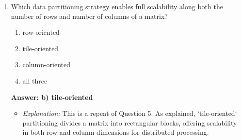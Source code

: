 \documentclass{article}
\begin{document}
\begin{enumerate}[label=\textbf{Question \arabic*.}]
\item Which data partitioning strategy enables full scalability along both the number of rows and number of columns of a matrix?
    \begin{enumerate}[label=\alph*)]
        \item row-oriented
        \item tile-oriented
        \item column-oriented
        \item all three
    \end{enumerate}
    \textbf{Answer: b) tile-oriented}
    \begin{itemize}
        \item \textit{Explanation:} This is a repeat of Question 5. As explained, `tile-oriented` partitioning divides a matrix into rectangular blocks, offering scalability in both row and column dimensions for distributed processing.
    \end{itemize}

\end{enumerate}
\end{document}
